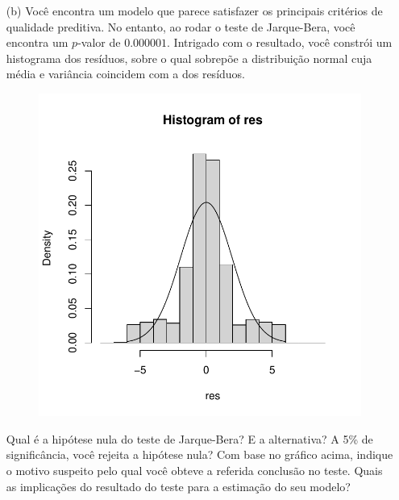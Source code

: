 \documentclass[10pt,a4paper]{article}
\begin{document}
\begin{enumerate}
\begin{itemize}
			\item[(b)] Você encontra um modelo que parece satisfazer os principais critérios de qualidade preditiva. No entanto, ao rodar o teste de Jarque-Bera, você encontra um $p$-valor de $0.000001$. Intrigado com o resultado, você constrói um histograma dos resíduos, sobre o qual sobrepõe a distribuição normal cuja média e variância coincidem com a dos resíduos.
			\begin{figure}[H]
				\centering
				\includegraphics[scale=0.6]{figuras/jb.pdf}
			\end{figure}
			
			
			Qual é a hipótese nula do teste de Jarque-Bera? E a alternativa? A 5\% de significância, você rejeita a hipótese nula? Com base no gráfico acima, indique o motivo suspeito pelo qual você obteve a referida conclusão no teste. Quais as implicações do resultado do teste para a estimação do seu modelo?
			
		\end{itemize}
		

\end{enumerate}
\end{document}

